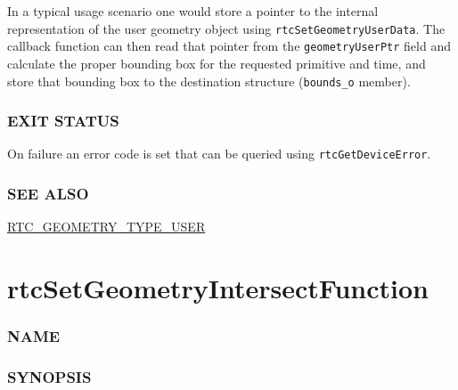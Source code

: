 In a typical usage scenario one would store a pointer to the internal
representation of the user geometry object using
\texttt{rtcSetGeometryUserData}. The callback function can then read
that pointer from the \texttt{geometryUserPtr} field and calculate the
proper bounding box for the requested primitive and time, and store that
bounding box to the destination structure (\texttt{bounds\_o} member).

\subsubsection{EXIT STATUS}\label{exit-status}

On failure an error code is set that can be queried using
\texttt{rtcGetDeviceError}.

\subsubsection{SEE ALSO}\label{see-also}

\hyperref[rtc_geometry_type_user]{RTC\_GEOMETRY\_TYPE\_USER}

\pagebreak

\section{rtcSetGeometryIntersectFunction}\label{rtcsetgeometryintersectfunction}

\subsubsection{NAME}\label{name}

\begin{Shaded}
\begin{Highlighting}[]
\OperatorTok{{-}}
\end{Highlighting}
\end{Shaded}

\subsubsection{SYNOPSIS}\label{synopsis}


